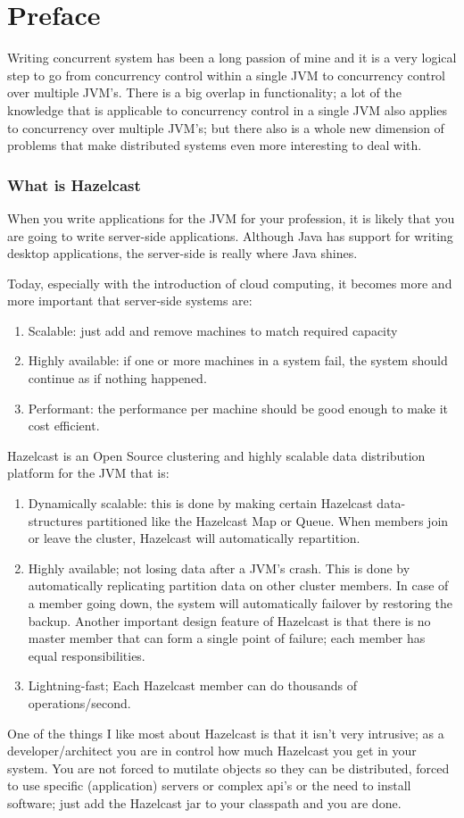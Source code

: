 \chapter*{Preface}
Writing concurrent system has been a long passion of mine and it is a very logical step to go from concurrency control within a single JVM to concurrency control over multiple JVM's. There is a big overlap in functionality; a lot of the knowledge that is applicable to concurrency control in a single JVM also applies to concurrency over multiple JVM's; but there also is a whole new dimension of problems that make distributed systems even more interesting to deal with. 
\subsection*{What is Hazelcast}
When you write applications for the JVM for your profession, it is likely that you are going to write server-side applications. Although Java has support for writing desktop applications, the server-side is really where Java shines.

Today, especially with the introduction of cloud computing, it becomes more and more important that server-side systems are:
\begin{enumerate}
\item Scalable: just add and remove machines to match required capacity 
\item Highly available: if one or more machines in a system fail, the system should continue as if nothing happened.
\item Performant: the performance per machine should be good enough to make it cost efficient.
\end{enumerate}

Hazelcast is an Open Source clustering and highly scalable data distribution platform for the JVM that is:
\begin{enumerate}
\item Dynamically scalable: this is done by making certain Hazelcast data-structures partitioned like the Hazelcast Map or Queue. When members join or leave the cluster, Hazelcast will automatically repartition.
\item Highly available; not losing data after a JVM's crash. This is done by automatically replicating partition data on other cluster members. In case of a member going down, the system will automatically failover by restoring the backup. Another important design feature of Hazelcast is that there is no master member that can form a single point of failure; each member has equal responsibilities.
\item Lightning-fast; Each Hazelcast member can do thousands of operations/second.
\end{enumerate}
One of the things I like most about Hazelcast is that it isn't very intrusive; as a developer/architect you are in control how much Hazelcast you get in your system. You are not forced to mutilate objects so they can be distributed, forced to use specific (application) servers or complex api's or the need to install software; just add the Hazelcast jar to your classpath and you are done.

